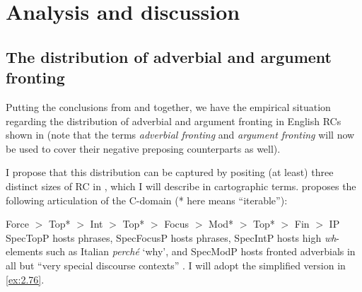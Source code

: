 \documentclass[output=paper]{langsci/langscibook}
\begin{document}
\section{Analysis and discussion}\label{sec:02.4}

\subsection{The distribution of adverbial and argument fronting}

Putting the conclusions from  and  together, we have the empirical
situation regarding the distribution of adverbial and argument
fronting in
English \glspl{RC} shown in  (note that the terms \emph{adverbial
fronting} and \emph{argument fronting} will now be used to cover their negative
preposing counterparts as well).

\begin{table}
\caption{Distribution of adverbial and argument fronting in full clausal
\glspl{RC} in . ✔: allowed; (✔): allowed
subject to restrictions; *: not allowed.\label{tab:15.2}}
\end{table}

I propose that this distribution can be captured by positing (at least) three
distinct sizes of \gls{RC} in , which I will
describe in cartographic terms.  \textcite[242]{Rizzi2004} proposes the
following articulation of the C-domain (* here means \enquote{iterable}):

\ea\label{ex:2.75}
    Force $>$ Top* $>$ Int $>$ Top* $>$ Focus $>$ Mod* $>$ Top* $>$ Fin $>$ IP
\z
SpecTopP hosts  phrases, SpecFocusP hosts  phrases, SpecIntP hosts
high \emph{wh}{-elements such as Italian} \emph{perché} ‘why’, and SpecModP
hosts fronted adverbials in all but \enquote{very special discourse contexts}
\parencite{Rizzi2004}. I will adopt the simplified version in \eqref{ex:2.76}.
\end{document}
